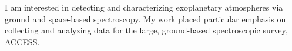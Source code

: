 
\begin{cventries}
\raggedright{
I am interested in detecting and characterizing exoplanetary atmospheres via ground and space-based spectroscopy. My work placed particular emphasis on collecting and analyzing data for the large, ground-based spectroscopic survey, \href{http://project-access.space/}{ACCESS}.
}

\end{cventries}